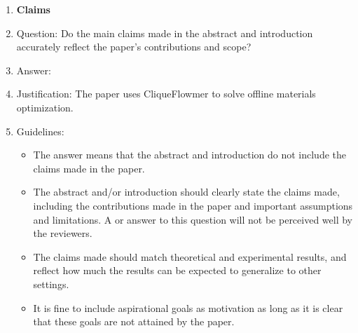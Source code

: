 \documentclass{article}
\theoremstyle{plain}
\theoremstyle{definition}
\theoremstyle{remark}
\begin{document}
\begin{enumerate}

\item {\bf Claims}
    \item[] Question: Do the main claims made in the abstract and introduction accurately reflect the paper's contributions and scope?
    \item[] Answer: \answerYes{} %
    \item[] Justification: The paper uses CliqueFlowmer to solve offline materials optimization.
    \item[] Guidelines:
    \begin{itemize}
        \item The answer \answerNA{} means that the abstract and introduction do not include the claims made in the paper.
        \item The abstract and/or introduction should clearly state the claims made, including the contributions made in the paper and important assumptions and limitations. A \answerNo{} or \answerNA{} answer to this question will not be perceived well by the reviewers. 
        \item The claims made should match theoretical and experimental results, and reflect how much the results can be expected to generalize to other settings. 
        \item It is fine to include aspirational goals as motivation as long as it is clear that these goals are not attained by the paper. 
    \end{itemize}


\end{enumerate}
\end{document}
